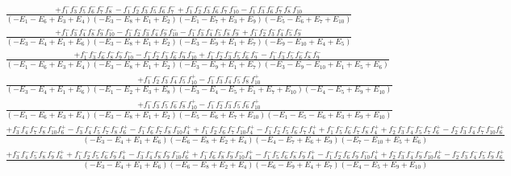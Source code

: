 \documentclass{article}
\begin{document}
\[\begin{array}{rcl}
\frac{+f_{1}^{-}f_{3}^{-}f_{5}^{-}f_{6}^{-}f_{7}^{-}f_{8}^{-}-f_{1}^{-}f_{2}^{-}f_{3}^{-}f_{5}^{-}f_{6}^{-}f_{7}^{-}+f_{1}^{-}f_{2}^{-}f_{3}^{-}f_{6}^{-}f_{7}^{-}f_{10}^{-}-f_{1}^{-}f_{3}^{-}f_{6}^{-}f_{7}^{-}f_{8}^{-}f_{10}^{-}}{(-E_{1}-E_{6}+E_{3}+E_{4})(-E_{3}-E_{8}+E_{1}+E_{2})(-E_{1}-E_{7}+E_{3}+E_{9})(-E_{5}-E_{6}+E_{7}+E_{10})}\\
\frac{+f_{1}^{-}f_{3}^{-}f_{4}^{-}f_{8}^{-}f_{9}^{-}f_{10}^{-}-f_{1}^{-}f_{2}^{-}f_{3}^{-}f_{4}^{-}f_{9}^{-}f_{10}^{-}-f_{1}^{-}f_{3}^{-}f_{4}^{-}f_{5}^{-}f_{8}^{-}f_{9}^{-}+f_{1}^{-}f_{2}^{-}f_{3}^{-}f_{4}^{-}f_{5}^{-}f_{9}^{-}}{(-E_{3}-E_{4}+E_{1}+E_{6})(-E_{3}-E_{8}+E_{1}+E_{2})(-E_{3}-E_{9}+E_{1}+E_{7})(-E_{9}-E_{10}+E_{4}+E_{5})}\\
\frac{+f_{1}^{-}f_{3}^{-}f_{6}^{-}f_{8}^{-}f_{9}^{-}f_{10}^{-}-f_{1}^{-}f_{2}^{-}f_{3}^{-}f_{6}^{-}f_{9}^{-}f_{10}^{-}+f_{1}^{-}f_{2}^{-}f_{3}^{-}f_{5}^{-}f_{6}^{-}f_{9}^{-}-f_{1}^{-}f_{3}^{-}f_{5}^{-}f_{6}^{-}f_{8}^{-}f_{9}^{-}}{(-E_{1}-E_{6}+E_{3}+E_{4})(-E_{3}-E_{8}+E_{1}+E_{2})(-E_{3}-E_{9}+E_{1}+E_{7})(-E_{3}-E_{9}-E_{10}+E_{1}+E_{5}+E_{6})}\\
\frac{+f_{1}^{-}f_{2}^{-}f_{3}^{-}f_{4}^{-}f_{5}^{-}f_{10}^{+}-f_{1}^{-}f_{3}^{-}f_{4}^{-}f_{5}^{-}f_{8}^{-}f_{10}^{+}}{(-E_{3}-E_{4}+E_{1}+E_{6})(-E_{1}-E_{2}+E_{3}+E_{8})(-E_{3}-E_{4}-E_{5}+E_{1}+E_{7}+E_{10})(-E_{4}-E_{5}+E_{9}+E_{10})}\\
\frac{+f_{1}^{-}f_{3}^{-}f_{5}^{-}f_{6}^{-}f_{8}^{-}f_{10}^{+}-f_{1}^{-}f_{2}^{-}f_{3}^{-}f_{5}^{-}f_{6}^{-}f_{10}^{+}}{(-E_{1}-E_{6}+E_{3}+E_{4})(-E_{3}-E_{8}+E_{1}+E_{2})(-E_{5}-E_{6}+E_{7}+E_{10})(-E_{1}-E_{5}-E_{6}+E_{3}+E_{9}+E_{10})}\\
\frac{+f_{3}^{-}f_{4}^{-}f_{7}^{-}f_{8}^{-}f_{10}^{-}f_{6}^{+}-f_{3}^{-}f_{4}^{-}f_{5}^{-}f_{7}^{-}f_{8}^{-}f_{6}^{+}-f_{1}^{-}f_{6}^{-}f_{7}^{-}f_{8}^{-}f_{10}^{-}f_{4}^{+}+f_{1}^{-}f_{2}^{-}f_{6}^{-}f_{7}^{-}f_{10}^{-}f_{4}^{+}-f_{1}^{-}f_{2}^{-}f_{5}^{-}f_{6}^{-}f_{7}^{-}f_{4}^{+}+f_{1}^{-}f_{5}^{-}f_{6}^{-}f_{7}^{-}f_{8}^{-}f_{4}^{+}+f_{2}^{-}f_{3}^{-}f_{4}^{-}f_{5}^{-}f_{7}^{-}f_{6}^{+}-f_{2}^{-}f_{3}^{-}f_{4}^{-}f_{7}^{-}f_{10}^{-}f_{6}^{+}}{(-E_{3}-E_{4}+E_{1}+E_{6})(-E_{6}-E_{8}+E_{2}+E_{4})(-E_{4}-E_{7}+E_{6}+E_{9})(-E_{7}-E_{10}+E_{5}+E_{6})}\\
\frac{+f_{3}^{-}f_{4}^{-}f_{5}^{-}f_{8}^{-}f_{9}^{-}f_{6}^{+}+f_{1}^{-}f_{2}^{-}f_{5}^{-}f_{6}^{-}f_{9}^{-}f_{4}^{+}-f_{3}^{-}f_{4}^{-}f_{8}^{-}f_{9}^{-}f_{10}^{-}f_{6}^{+}+f_{1}^{-}f_{6}^{-}f_{8}^{-}f_{9}^{-}f_{10}^{-}f_{4}^{+}-f_{1}^{-}f_{5}^{-}f_{6}^{-}f_{8}^{-}f_{9}^{-}f_{4}^{+}-f_{1}^{-}f_{2}^{-}f_{6}^{-}f_{9}^{-}f_{10}^{-}f_{4}^{+}+f_{2}^{-}f_{3}^{-}f_{4}^{-}f_{9}^{-}f_{10}^{-}f_{6}^{+}-f_{2}^{-}f_{3}^{-}f_{4}^{-}f_{5}^{-}f_{9}^{-}f_{6}^{+}}{(-E_{3}-E_{4}+E_{1}+E_{6})(-E_{6}-E_{8}+E_{2}+E_{4})(-E_{6}-E_{9}+E_{4}+E_{7})(-E_{4}-E_{5}+E_{9}+E_{10})}\\

\end{array}\]
\end{document}
